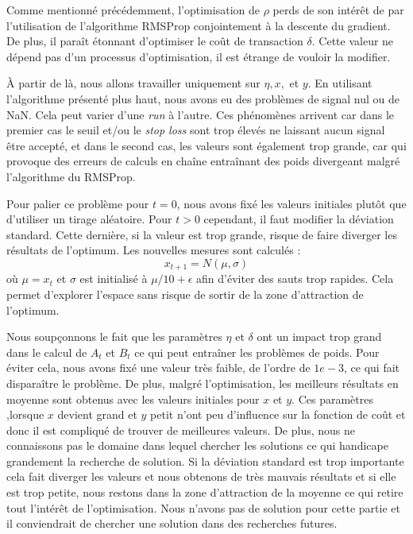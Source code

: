 \documentclass[a4paper, 11pt]{article}
\begin{document}
  Comme mentionné précédemment, l'optimisation de $\rho$ perds de son intérêt de par l'utilisation de l'algorithme RMSProp conjointement à la descente du
  gradient. De plus, il paraît étonnant d'optimiser le coût de transaction $\delta$. Cette valeur ne dépend pas d'un processus d'optimisation, il est
  étrange de vouloir la modifier.
  
  À partir de là, nous allons travailler uniquement sur $\eta,x,$ et $y$. En utilisant l'algorithme présenté plus haut, nous avons eu des problèmes
  de signal nul ou de NaN. Cela peut varier d'une \textit{run} à l'autre. Ces phénomènes arrivent car dans le premier cas le seuil et/ou le \textit{stop
  loss} sont trop élevés ne laissant aucun signal être accepté, et dans le second cas, les valeurs sont également trop grande, car qui provoque des erreurs
  de calculs en chaîne entraînant des poids divergeant malgré l'algorithme du RMSProp.
  
  Pour palier ce problème pour $t=0$, nous avons fixé les valeurs initiales plutôt que d'utiliser un tirage aléatoire. Pour $t>0$ cependant, il
  faut modifier la déviation standard. Cette dernière, si la valeur est trop grande, risque de faire diverger les résultats de l'optimum.
  Les nouvelles mesures sont calculés :
  $$x_{t+1} = N(\mu, \sigma)$$
  où $\mu = x_t$ et $\sigma$ est initialisé à $\mu/10 + \epsilon$ afin d'éviter des sauts trop rapides. Cela permet d'explorer l'espace sans risque de
  sortir de la zone d'attraction de l'optimum.
 
 Nous soupçonnons le fait que les paramètres $\eta$ et $\delta$ ont un impact trop grand dans le calcul de $A_t$ et $B_t$ ce qui peut entraîner les
 problèmes de poids. Pour éviter cela, nous avons fixé une valeur très faible, de l'ordre de $1e-3$, ce qui fait disparaître le problème.
 De plus, malgré l'optimisation, les meilleurs résultats en moyenne sont obtenus avec les valeurs initiales pour $x$ et $y$. Ces paramètres ,lorsque 
 $x$ devient grand et $y$ petit n'ont peu d'influence sur la fonction de coût et donc il est compliqué de trouver de meilleures valeurs.
 De plus, nous ne connaissons pas le domaine dans lequel chercher les solutions ce qui handicape grandement la recherche de solution. Si la déviation 
 standard est trop importante cela fait diverger les valeurs et nous obtenons de très mauvais résultats et si elle est trop petite, nous restons dans
 la zone d'attraction de la moyenne ce qui retire tout l'intérêt de l'optimisation.
 Nous n'avons pas de solution pour cette partie et il conviendrait de chercher une solution dans des recherches futures.
 
\end{document}
